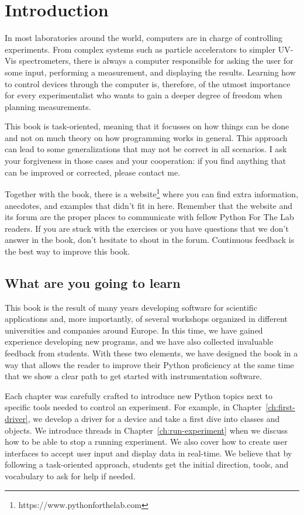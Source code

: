 \chapter{Introduction}\label{ch:introduction}
In most laboratories around the world, computers are in charge of controlling experiments. From complex systems such as particle accelerators to simpler UV-Vis spectrometers, there is always a computer responsible for asking the user for some input, performing a measurement, and displaying the results. Learning how to control devices through the computer is, therefore, of the utmost importance for every experimentalist who wants to gain a deeper degree of freedom when planning measurements.

This book is task-oriented, meaning that it focusses on how things can be done and not on much theory on how programming works in general. This approach can lead to some generalizations that may not be correct in all scenarios. I ask your forgiveness in those cases and your cooperation: if you find anything that can be improved or corrected, please contact me.

Together with the book, there is a website\footnote{https://www.pythonforthelab.com} where you can find extra information, anecdotes, and examples that didn't fit in here. Remember that the website and its forum are the proper places to communicate with fellow Python For The Lab readers. If you are stuck with the exercises or you have questions that we don't answer in the book, don't hesitate to shout in the forum. Continuous feedback is the best way to improve this book.

\section{What are you going to learn}\label{sec:what-are-you-going-to-learn}
This book is the result of many years developing software for scientific applications and, more importantly, of several workshops organized in different universities and companies around Europe. In this time, we have gained experience developing new programs, and we have also collected invaluable feedback from students. With these two elements, we have designed the book in a way that allows the reader to improve their Python proficiency at the same time that we show a clear path to get started with instrumentation software.

Each chapter was carefully crafted to introduce new Python topics next to specific tools needed to control an experiment. For example, in Chapter~\ref{ch:first-driver}, we develop a driver for a device and take a first dive into classes and objects. We introduce threads in Chapter~\ref{ch:run-experiment} when we discuss how to be able to stop a running experiment. We also cover how to create user interfaces to accept user input and display data in real-time. We believe that by following a task-oriented approach, students get the initial direction, tools, and vocabulary to ask for help if needed.

